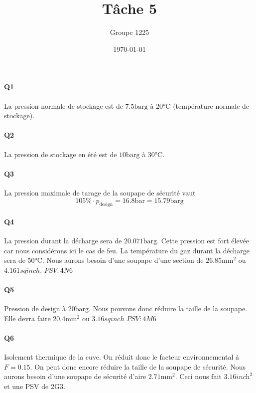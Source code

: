 \documentclass[a4paper,oneside,12pt]{article}
\title{T\^ache 5}
\author{Groupe 1225}
\date{\today}
\newcommand{\barg}{\si{\bar}\text{g}}
\begin{document}
\maketitle

\paragraph{Q1} La pression normale de stockage est de $7.5 \barg$ à $20\si{\celsius}$ 
(température normale de stockage).

\paragraph{Q2} La pression de stockage en été est de $10 \barg$ à $30\si{\celsius}$.

\paragraph{Q3} La pression maximale de tarage de la soupape de sécurité vaut 
\[ 105\% \cdot p_{\text{design}} = 16.8\si{\bar} = 15.79\barg \]

\paragraph{Q4} 
La pression durant la décharge sera de $20.071 \barg$. 
Cette pression est fort élevée car nous considérons ici le cas de feu. 
La température du gaz durant la décharge sera de $50\si{\celsius}$. 
Nous aurons besoin d'une soupape d'une section de $26.85\si{\milli\meter\squared}$ 
ou $4.161 sqinch$. $PSV : 4N6$
\paragraph{Q5} 
  Pression de design à $20\barg$. Nous pouvons donc réduire la taille de la soupape. Elle devra faire $20.4\si{\milli\meter\squared}$ ou 
  $3.16 sqinch$ $PSV : 4M6$
\paragraph{Q6}
Isolement thermique de la cuve. 
On réduit donc le facteur environnemental à $F = 0.15$. 
On peut donc encore réduire la taille de la soupape de sécurité. 
Nous aurons besoin d'une soupape de sécurité d'aire $2.71\si{\milli\meter\squared}$. 
Ceci nous fait $3.16 \textit{inch}^2$ et une PSV de 2G3.
\end{document}
